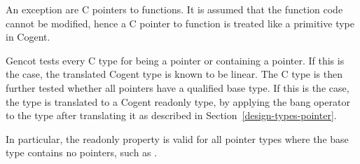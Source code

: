 An exception are C pointers to functions. It is assumed that the function code cannot be modified, hence a C pointer 
to function is treated like a primitive type in Cogent.

Gencot tests every C type for being a pointer or containing a pointer. If this is the case, the translated Cogent 
type is known to be linear. The C type is then further tested whether all pointers have a  qualified
base type. If this is the case, the type is translated to a Cogent readonly type,
by applying the bang operator \code{!} to the type after translating it as described in Section~\ref{design-types-pointer}.

In particular, the readonly property is valid for all pointer types where the base type contains no pointers, such as
.




